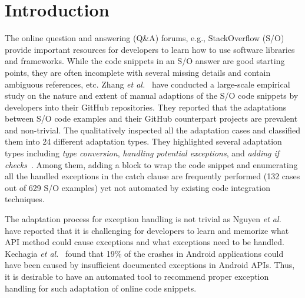 \section{Introduction}
\label{sec:intro}

The online question and answering (Q\&A) forums, e.g., StackOverflow
(S/O) provide important resources for developers to learn how to use
software libraries and frameworks. While the code snippets in an S/O
answer are good starting points, they are often incomplete with
several missing details and contain ambiguous references, etc.  Zhang
{\em et al.}~\cite{zhang-icse19} have conducted a large-scale
empirical study on the nature and extent of manual adaptions of the
S/O code snippets by developers into their GitHub repositories.  They
reported that the adaptations between S/O code examples and their
GitHub counterpart projects are prevalent and non-trivial. The
qualitatively inspected all the adaptation cases and classified them
into 24 different adaptation types. They highlighted several
adaptation types including {\em type conversion}, {\em handling
  potential exceptions}, and {\em adding if
  checks}~\cite{zhang-icse19}. Among them, adding a 
block to wrap the code snippet and enumerating all the handled
exceptions in the catch clause are frequently performed (132 cases out
of 629 S/O examples) yet not automated by existing code integration
techniques.

The adaptation process for exception handling is not trivial as Nguyen
{\em et al.}~\cite{xrank-fse20} have reported that it is challenging
for developers to learn and memorize what API method could cause
exceptions and what exceptions need to be handled. Kechagia {\em et
  al.}~\cite{kechagia-msr14} found that 19\% of the crashes in Android
applications could have been caused by insufficient documented
exceptions in Android APIs. Thus, it is desirable to have an automated
tool to recommend proper exception handling for such adaptation of
online code snippets.

